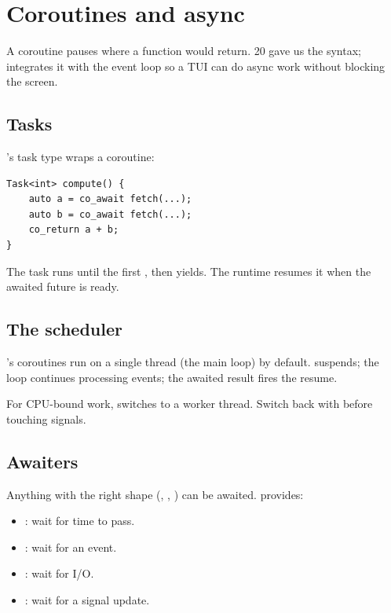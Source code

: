 \chapter{Coroutines and async}
\label{ch:async}

\begin{aside}
A coroutine pauses where a function would return. \cpp{}20
gave us the syntax; \maya{} integrates it with the event loop
so a TUI can do async work without blocking the screen.
\end{aside}

\section{Tasks}

\maya{}'s task type wraps a \cpp{} coroutine:

\begin{lstlisting}
Task<int> compute() {
    auto a = co_await fetch(...);
    auto b = co_await fetch(...);
    co_return a + b;
}
\end{lstlisting}

The task runs until the first , then yields.
The runtime resumes it when the awaited future is ready.

\section{The scheduler}

\maya{}'s coroutines run on a single thread (the main loop)
by default.  suspends; the loop continues
processing events; the awaited result fires the resume.

For CPU-bound work, 
switches to a worker thread. Switch back with
 before touching signals.

\section{Awaiters}

Anything with the right shape (,
, ) can be
awaited. \maya{} provides:

\begin{itemize}[leftmargin=*]
  \item {}: wait for time to pass.
  \item {}: wait for an event.
  \item {}: wait for I/O.
  \item {}: wait for a
    signal update.
\end{itemize}

